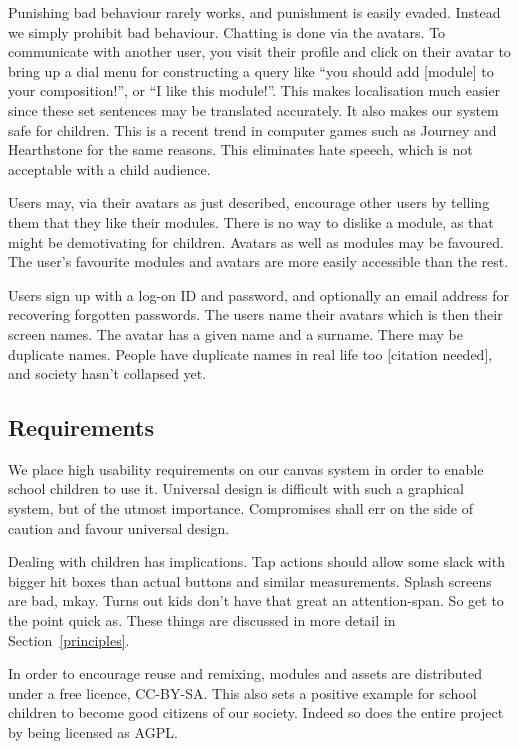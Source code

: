 Punishing bad behaviour rarely works, and punishment is easily evaded. Instead 
we simply prohibit bad behaviour. Chatting is done via the avatars. To 
communicate with another user, you visit their profile and click on their 
avatar to bring up a dial menu for constructing a query like ``you should add 
[module] to your composition!'', or ``I like this module!''. This makes 
localisation much easier since these set sentences may be translated 
accurately. It also makes our system safe for 
children\cite{sadler2012virtual}. This is a recent trend in computer games 
such as Journey and Hearthstone for the same reasons. This eliminates hate 
speech\cite{hearthstone}, which is not acceptable with a child audience.

Users may, via their avatars as just described, encourage other users by 
telling them that they like their modules. There is no way to dislike a 
module, as that might be demotivating for children. Avatars as well as modules 
may be favoured. The user's favourite modules and avatars are more easily 
accessible than the rest.

Users sign up with a log-on ID and password, and optionally an email address 
for recovering forgotten passwords. The users name their avatars which is then 
their screen names. The avatar has a given name and a surname. There may be 
duplicate names. People have duplicate names in real life too [citation 
needed], and society hasn't collapsed yet.

\subsection{Requirements}
We place high usability requirements on our canvas system in order to enable
school children to use it. Universal design is difficult with such a graphical 
system, but of the utmost importance. Compromises shall err on the side of 
caution and favour universal design.

Dealing with children has implications. Tap actions should allow some slack 
with bigger hit boxes than actual buttons and similar measurements. Splash 
screens are bad, mkay. Turns out kids don't have that great an attention-span. 
So get to the point quick as. These things are discussed in more detail in 
Section~\ref{principles}.

In order to encourage reuse and remixing, modules and assets are distributed 
under a free licence, CC-BY-SA\@. This also sets a positive example for school 
children to become good citizens of our society. Indeed so does the entire 
project by being licensed as AGPL\@\cite{educational}.

